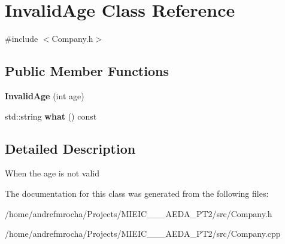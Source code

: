 \hypertarget{class_invalid_age}{}\section{Invalid\+Age Class Reference}
\label{class_invalid_age}


{\ttfamily \#include $<$Company.\+h$>$}

\subsection*{Public Member Functions}
\begin{DoxyCompactItemize}
\item 
\mbox{\label{class_invalid_age_ae1ed3ee78dd4c589a64d939b90aa09f3}} 
{\bfseries Invalid\+Age} (int age)
\item 
\mbox{\label{class_invalid_age_a6961abe914f41e975a7b0ebd526e3ea4}} 
std\+::string {\bfseries what} () const
\end{DoxyCompactItemize}


\subsection{Detailed Description}
When the age is not valid 

The documentation for this class was generated from the following files\+:\begin{DoxyCompactItemize}
\item 
/home/andrefmrocha/\+Projects/\+M\+I\+E\+I\+C\+\_\+\_\+\_\+\+A\+E\+D\+A\+\_\+\+P\+T2/src/Company.\+h\item 
/home/andrefmrocha/\+Projects/\+M\+I\+E\+I\+C\+\_\+\_\+\_\+\+A\+E\+D\+A\+\_\+\+P\+T2/src/Company.\+cpp\end{DoxyCompactItemize}
